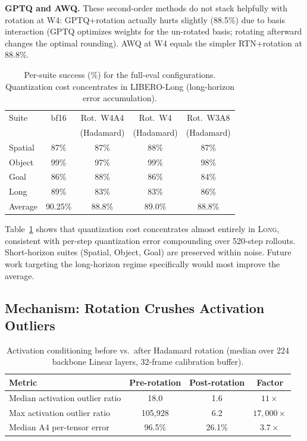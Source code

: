 \documentclass[conference]{IEEEtran}
\begin{document}
\textbf{GPTQ and AWQ.} These second-order methods do not stack helpfully with rotation at
W4: GPTQ+rotation actually hurts slightly (88.5\%) due to basis interaction (GPTQ optimizes
weights for the un-rotated basis; rotating afterward changes the optimal rounding). AWQ at
W4 equals the simpler RTN+rotation at 88.8\%.

\begin{table}[h]\centering\small
\caption{Per-suite success (\%) for the full-eval configurations. Quantization cost
concentrates in LIBERO-Long (long-horizon error accumulation).}
\label{tab:persuite}
\begin{tabular}{lcccc}
\toprule
Suite & bf16 & Rot.\ W4A4 & Rot.\ W4 & Rot.\ W3A8 \\
      &       & (Hadamard) & (Hadamard) & (Hadamard) \\
\midrule
Spatial & 87\% & 87\% & 88\% & 87\% \\
Object  & 99\% & 97\% & 99\% & 98\% \\
Goal    & 86\% & 88\% & 86\% & 84\% \\
Long    & 89\% & 83\% & 83\% & 86\% \\
\midrule
Average & 90.25\% & 88.8\% & 89.0\% & 88.8\% \\
\bottomrule
\end{tabular}
\end{table}

Table~\ref{tab:persuite} shows that quantization cost concentrates almost entirely in
\textsc{Long}, consistent with per-step quantization error compounding over 520-step
rollouts. Short-horizon suites (Spatial, Object, Goal) are preserved within noise. Future
work targeting the long-horizon regime specifically would most improve the average.

\subsection{Mechanism: Rotation Crushes Activation Outliers}
\label{sec:mech}

\begin{table}[h]\centering\small
\caption{Activation conditioning before vs.\ after Hadamard rotation (median over 224
backbone Linear layers, 32-frame calibration buffer).}
\label{tab:mech}
\begin{tabular}{lccc}
\toprule
Metric & Pre-rotation & Post-rotation & Factor \\
\midrule
Median activation outlier ratio & 18.0 & 1.6 & $11\times$ \\
Max activation outlier ratio & 105,928 & 6.2 & $17{,}000\times$ \\
Median A4 per-tensor error & 96.5\% & 26.1\% & $3.7\times$ \\
\bottomrule
\end{tabular}
\end{table}
\end{document}
